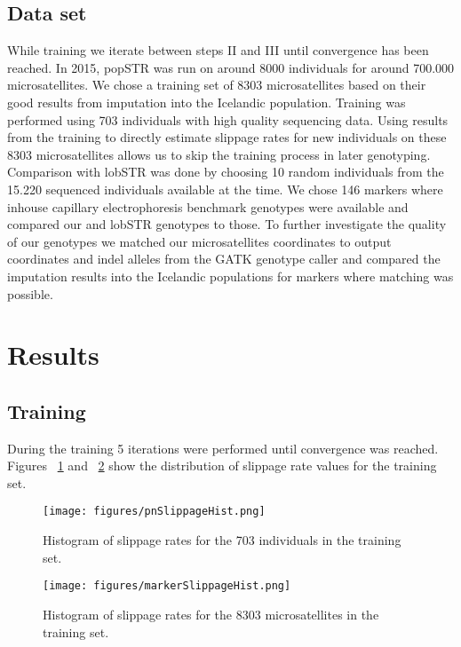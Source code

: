 \documentclass{bioinfo}
\begin{document}
\subsection{Data set}
 While training we iterate between steps II and III until convergence has been reached. In 2015, popSTR was run on around 8000 individuals for around 700.000 microsatellites. We chose a training set of 8303 microsatellites based on their good results from imputation into the Icelandic population. Training was performed using 703 individuals with high quality sequencing data.
 Using results from the training to directly estimate slippage rates for new individuals on these 8303 microsatellites allows us to skip the training process in later genotyping. 
 Comparison with lobSTR was done by choosing 10 random individuals from the 15.220 sequenced individuals available at the time. We chose 146 markers where inhouse capillary electrophoresis benchmark genotypes were available and compared our and lobSTR genotypes to those.
 To further investigate the quality of our genotypes we matched our microsatellites coordinates to output coordinates and indel alleles from the GATK genotype caller and compared the imputation results into the Icelandic populations for markers where matching was possible. 
 
\section{Results}
\subsection{Training}
During the training 5 iterations were performed until convergence was reached. Figures ~\ref{fig:pnSlipp} and ~\ref{fig:markerSlipp} show the distribution of slippage rate values for the training set.
\begin{figure}[H]
\centering
 \texttt{[image: figures/pnSlippageHist.png]}
  \caption[Histogram of pn-slippage]{Histogram of slippage rates for the 703 individuals in the training set.}
 \label{fig:pnSlipp}
\end{figure}

\begin{figure}[H]
\centering
 \texttt{[image: figures/markerSlippageHist.png]}
  \caption[Histogram of marker-slippage]{Histogram of slippage rates for the 8303 microsatellites in the training set.}
 \label{fig:markerSlipp}
\end{figure}
\end{document}
